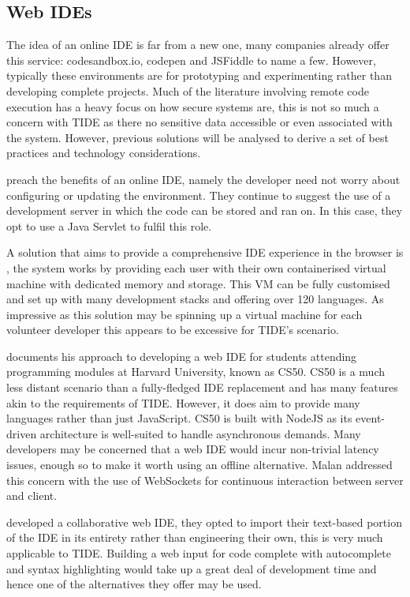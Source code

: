 \documentclass[jou,apacite]{apa6}
\begin{document}
\subsection{Web IDEs}
The idea of an online IDE is far from a new one, many companies already offer this service: codesandbox.io, codepen and JSFiddle to name a few. However, typically these environments are for prototyping and experimenting rather than developing complete projects. Much of the literature involving remote code execution has a heavy focus on how secure systems are, this is not so much a concern with TIDE as there no sensitive data accessible or even associated with the system. However, previous solutions will be analysed to derive a set of best practices and technology considerations.

\cite{Aho2011} preach the benefits of an online IDE, namely the developer need not worry about configuring or updating the environment. They continue to suggest the use of a development server in which the code can be stored and ran on. In this case, they opt to use a Java Servlet to fulfil this role.

A solution that aims to provide a comprehensive IDE experience in the browser is \cite{codeanywhere}, the system works by providing each user with their own containerised virtual machine with dedicated memory and storage. This VM can be fully customised and set up with many development stacks and offering over 120 languages. As impressive as this solution may be spinning up a virtual machine for each volunteer developer this appears to be excessive for TIDE's scenario. 

\cite{Malan2013} documents his approach to developing a web IDE for students attending programming modules at Harvard University, known as CS50. CS50 is a much less distant scenario than a fully-fledged IDE  replacement and has many features akin to the requirements of TIDE. However, it does aim to provide many languages rather than just JavaScript. CS50 is built with NodeJS as its event-driven architecture is well-suited to handle asynchronous demands. Many developers may be concerned that a web IDE would incur non-trivial latency issues, enough so to make it worth using an offline alternative. Malan addressed this concern with the use of WebSockets for continuous interaction between server and client.

\cite{Goldman2011} developed a collaborative web IDE, they opted to import their text-based portion of the IDE in its entirety rather than engineering their own, this is very much applicable to TIDE. Building a web input for code complete with autocomplete and syntax highlighting would take up a great deal of development time and hence one of the alternatives they offer may be used. 
\end{document}

